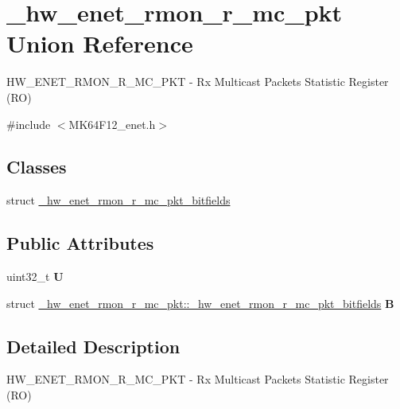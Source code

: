 \hypertarget{union__hw__enet__rmon__r__mc__pkt}{}\section{\+\_\+hw\+\_\+enet\+\_\+rmon\+\_\+r\+\_\+mc\+\_\+pkt Union Reference}
\label{union__hw__enet__rmon__r__mc__pkt}


H\+W\+\_\+\+E\+N\+E\+T\+\_\+\+R\+M\+O\+N\+\_\+\+R\+\_\+\+M\+C\+\_\+\+P\+KT -\/ Rx Multicast Packets Statistic Register (RO)  




{\ttfamily \#include $<$M\+K64\+F12\+\_\+enet.\+h$>$}

\subsection*{Classes}
\begin{DoxyCompactItemize}
\item 
struct \hyperlink{struct__hw__enet__rmon__r__mc__pkt_1_1__hw__enet__rmon__r__mc__pkt__bitfields}{\+\_\+hw\+\_\+enet\+\_\+rmon\+\_\+r\+\_\+mc\+\_\+pkt\+\_\+bitfields}
\end{DoxyCompactItemize}
\subsection*{Public Attributes}
\begin{DoxyCompactItemize}
\item 
uint32\+\_\+t {\bfseries U}\hypertarget{union__hw__enet__rmon__r__mc__pkt_a005f29aac9215d2ccdcaac9ff4994197}{}\label{union__hw__enet__rmon__r__mc__pkt_a005f29aac9215d2ccdcaac9ff4994197}

\item 
struct \hyperlink{struct__hw__enet__rmon__r__mc__pkt_1_1__hw__enet__rmon__r__mc__pkt__bitfields}{\+\_\+hw\+\_\+enet\+\_\+rmon\+\_\+r\+\_\+mc\+\_\+pkt\+::\+\_\+hw\+\_\+enet\+\_\+rmon\+\_\+r\+\_\+mc\+\_\+pkt\+\_\+bitfields} {\bfseries B}\hypertarget{union__hw__enet__rmon__r__mc__pkt_ae19d8c41642852f95ba4863b817c7aca}{}\label{union__hw__enet__rmon__r__mc__pkt_ae19d8c41642852f95ba4863b817c7aca}

\end{DoxyCompactItemize}


\subsection{Detailed Description}
H\+W\+\_\+\+E\+N\+E\+T\+\_\+\+R\+M\+O\+N\+\_\+\+R\+\_\+\+M\+C\+\_\+\+P\+KT -\/ Rx Multicast Packets Statistic Register (RO) 

